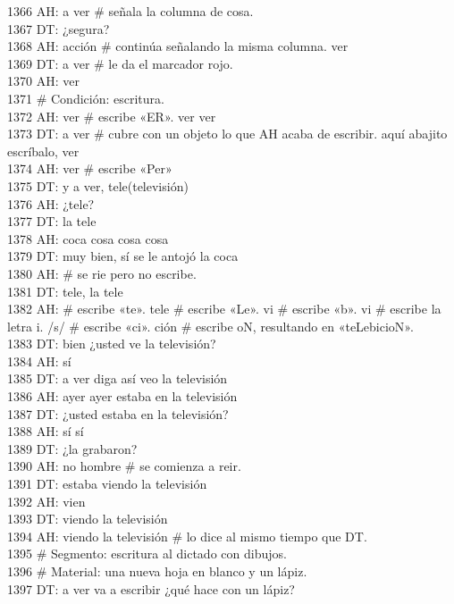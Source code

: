 1366 AH: a ver # señala la columna de cosa.\\
1367 DT: ¿segura?\\
1368 AH: acción # continúa señalando la misma columna. ver\\
1369 DT: a ver # le da el marcador rojo.\\
1370 AH: ver\\
1371 # Condición: escritura.\\
1372 AH: ver # escribe «ER». ver ver \\
1373 DT: a ver # cubre con un objeto lo que AH acaba de escribir. aquí abajito escríbalo, ver\\
1374 AH: ver # escribe «Per»\\
1375 DT: y a ver, tele(televisión)\\
1376 AH: ¿tele?\\
1377 DT: la tele\\
1378 AH: coca cosa cosa cosa\\
1379 DT: muy bien, sí se le antojó la coca\\
1380 AH: # se rie pero no escribe.\\
1381 DT: tele, la tele\\
1382 AH: # escribe «te». tele # escribe «Le». vi # escribe «b». vi # escribe la letra i. /s/ # escribe «ci». ción # escribe oN, resultando en «teLebicioN».\\
1383 DT: bien ¿usted ve la televisión?\\
1384 AH: sí\\
1385 DT: a ver diga así veo la televisión\\
1386 AH: ayer ayer estaba en la televisión\\
1387 DT: ¿usted estaba en la televisión?\\
1388 AH: sí sí\\
1389 DT: ¿la grabaron?\\
1390 AH: no hombre # se comienza a reir.\\
1391 DT: estaba viendo la televisión\\
1392 AH: vien\\
1393 DT: viendo la televisión\\
1394 AH: viendo la televisión # lo dice al mismo tiempo que DT.\\
1395 # Segmento: escritura al dictado con dibujos.\\
1396 # Material: una nueva hoja en blanco y un lápiz.\\
1397 DT: a ver va a escribir ¿qué hace con un lápiz?\\
